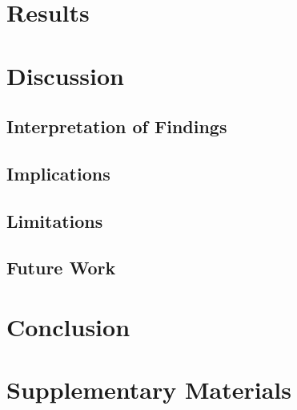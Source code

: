 \documentclass[12pt]{report}
\begin{document}

\chapter{Results}
\label{ch:results}


\chapter{Discussion}
\label{ch:discussion}

\section{Interpretation of Findings}
\label{sec:interpretation}

\section{Implications}
\label{sec:implications}

\section{Limitations}
\label{sec:limitations}

\section{Future Work}
\label{sec:future}

\chapter{Conclusion}
\label{ch:conclusion}





\appendix
\chapter{Supplementary Materials}
\label{app:supplementary}

\end{document}
